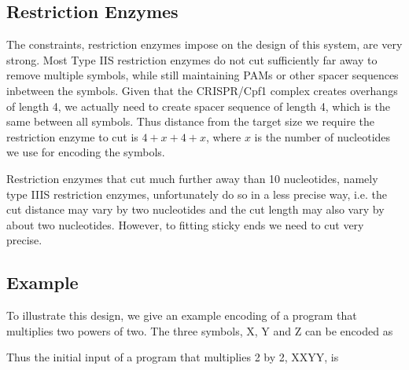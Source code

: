 \documentclass[
11pt, %
a4paper, %
oneside, %
headinclude,footinclude, %
BCOR5mm, %
]{scrartcl}
\begin{document}
\subsection{Restriction Enzymes}

The constraints, restriction enzymes impose on the design of this system, are
very strong. Most Type IIS restriction enzymes do not cut sufficiently far away
to remove multiple symbols, while still maintaining PAMs or other spacer
sequences inbetween the symbols. Given that the CRISPR/Cpf1 complex creates
overhangs of length 4, we actually need to create spacer sequence of length 4,
which is the same between all symbols. Thus distance from the target size we
require the restriction enzyme to cut is $4 + x + 4 + x$, where $x$ is the
number of nucleotides we use for encoding the symbols.

Restriction enzymes that cut much further away than 10 nucleotides, namely type
IIIS restriction enzymes, unfortunately do so in a less precise way, i.e. the
cut distance may vary by two nucleotides and the cut length may also vary by
about two nucleotides. However, to fitting sticky ends we need to cut very
precise.

\subsection{Example}
To illustrate this design, we give an example encoding of a program that
multiplies two powers of two. The three symbols, X, Y and Z can be encoded as

\begin{center}
\end{center}
Thus the initial input of a program that multiplies 2 by 2, XXYY, is
\end{document}

